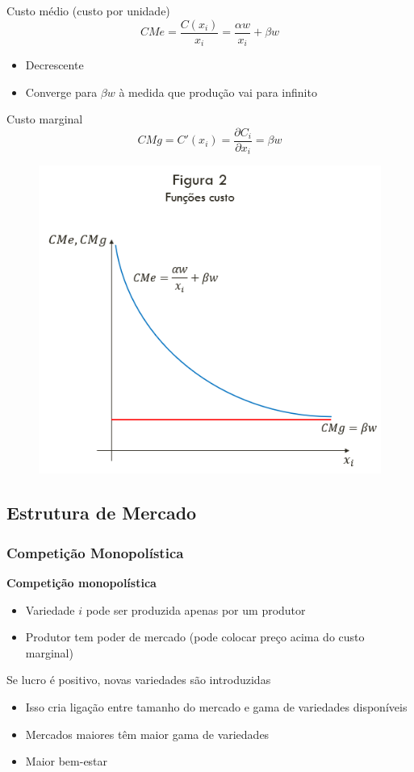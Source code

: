 \documentclass[a4paper,12pt]{article}[abntex2]
\begin{document}
Custo médio (custo por unidade)
\[
CMe = \frac{C(x_i)}{x_i} = \frac{\alpha w}{x_i} + \beta w
\]
\begin{itemize}
    \item Decrescente
    \item Converge para \(\beta w\) à medida que produção vai para infinito
\end{itemize}

Custo marginal
\[
CMg = C'(x_i) = \frac{\partial C_i}{\partial x_i}   =\beta w
\]

\begin{figure}[H]
    \centering
    \includegraphics[width=0.75\linewidth]{Imagens/a16i6.png}
\end{figure}

\subsection{\textbf{Estrutura de Mercado}}
\subsubsection{\textbf{Competição Monopolística}}
\textbf{Competição monopolística}
\begin{itemize}
    \item Variedade \(i\) pode ser produzida apenas por um produtor
    \item Produtor tem poder de mercado (pode colocar preço acima do custo marginal)
\end{itemize}

Se lucro é positivo, novas variedades são introduzidas
\begin{itemize}
    \item Isso cria ligação entre tamanho do mercado e gama de variedades disponíveis
    \item Mercados maiores têm maior gama de variedades
    \item Maior bem-estar
\end{itemize}
\end{document}
